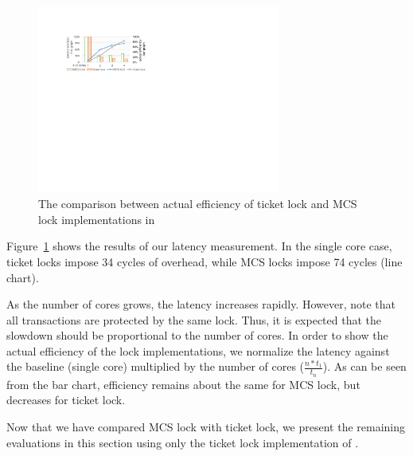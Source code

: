 \begin{figure}\centering
	\hspace{-.2cm}
	\includegraphics[width=8cm]{figs/locks.pdf}
	\hspace{-.2cm}
	\caption{The comparison between actual efficiency of ticket lock and MCS lock implementations in \mCTOS{}}
	\label{fig:locks}
\vspace*{-10pt}        
\end{figure}

Figure~\ref{fig:locks} shows the results of our latency
measurement. In the single core case, ticket locks impose 34 cycles of
overhead, while MCS locks impose 74 cycles (line chart).
As the number of cores grows, the latency increases rapidly. However,
note that all transactions are protected by the same lock. Thus, it is
expected that the slowdown should be proportional to the number of
cores. In order to show the actual efficiency of the lock
implementations, we normalize the latency against the baseline (single
core) multiplied by the number of cores ($\frac{n*t_1}{t_n}$). As can
be seen from the bar chart, efficiency remains about the same for MCS
lock, but decreases for ticket lock.

Now that we have compared MCS lock with ticket lock, we present the
remaining evaluations in this section using only the ticket lock
implementation of \mCTOS{}.

